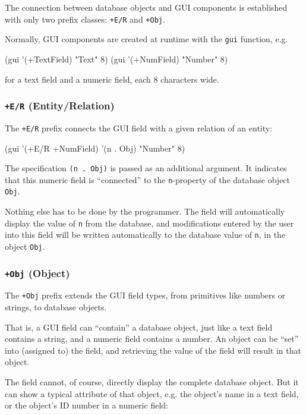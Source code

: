 The connection between database objects and GUI components is
established with only two prefix classes: \texttt{+E/R} and \texttt{+Obj}.

Normally, GUI components are created at runtime with the \texttt{gui} function,
e.g.


\begin{wideverbatim}
(gui '(+TextField) "Text" 8)
(gui '(+NumField) "Number" 8)
\end{wideverbatim}

for a text field and a numeric field, each 8 characters wide.
 
\subsubsection{\texttt{+E/R} (Entity/Relation)}
\label{sec:ul-entity-relation}

The \texttt{+E/R} prefix connects the GUI field with a given relation of an
entity:

\begin{wideverbatim}
(gui '(+E/R +NumField) '(n . Obj) "Number" 8)
\end{wideverbatim}

The specification \texttt{(n . Obj)} is passed as an additional argument. It
indicates that this numeric field is ``connected'' to the \texttt{n}-property of
the database object \texttt{Obj}.

Nothing else has to be done by the programmer. The field will
automatically display the value of \texttt{n} from the database, and
modifications entered by the user into this field will be written
automatically to the database value of \texttt{n}, in the object \texttt{Obj}.

\subsubsection{\texttt{+Obj} (Object)}
\label{sec:ul-object}

The \texttt{+Obj} prefix extends the GUI field types, from primitives like
numbers or strings, to database objects.

That is, a GUI field can ``contain'' a database object, just like a text
field contains a string, and a numeric field contains a number. An
object can be ``set'' into (assigned to) the field, and retrieving the
value of the field will result in that object.

The field cannot, of course, directly display the complete database
object. But it can show a typical attribute of that object, e.g. the
object's name in a text field, or the object's ID number in a numeric
field:


